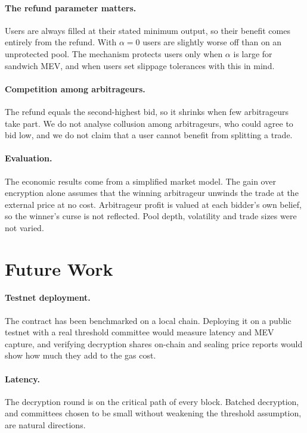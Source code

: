 \paragraph{The refund parameter matters.} Users are always filled at their stated minimum output, so their benefit comes entirely from the refund. With $\alpha=0$ users are slightly worse off than on an unprotected pool. The mechanism protects users only when $\alpha$ is large for sandwich MEV, and when users set slippage tolerances with this in mind.

\paragraph{Competition among arbitrageurs.} The refund equals the second-highest bid, so it shrinks when few arbitrageurs take part. We do not analyse collusion among arbitrageurs, who could agree to bid low, and we do not claim that a user cannot benefit from splitting a trade.

\paragraph{Evaluation.} The economic results come from a simplified market model. The gain over encryption alone assumes that the winning arbitrageur unwinds the trade at the external price at no cost. Arbitrageur profit is valued at each bidder's own belief, so the winner's curse is not reflected. Pool depth, volatility and trade sizes were not varied.

\section{Future Work}

\paragraph{Testnet deployment.} The contract has been benchmarked on a local chain. Deploying it on a public testnet with a real threshold committee would measure latency and MEV capture, and verifying decryption shares on-chain and sealing price reports would show how much they add to the gas cost.

\paragraph{Latency.} The decryption round is on the critical path of every block. Batched decryption, and committees chosen to be small without weakening the threshold assumption, are natural directions.

